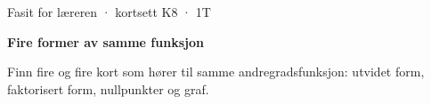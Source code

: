 \documentclass[11pt,a4paper]{article}
\begin{document}
\begin{minipage}[t]{0.8\linewidth}\vspace{0pt}
{\sffamily\small\color{dempet}Fasit for læreren · kortsett K8 · 1T}\par\vspace{0.25em}
{\fontsize{20}{24}\selectfont\bfseries Fire former av samme funksjon}\par\vspace{0.5em}
Finn fire og fire kort som hører til samme andregradsfunksjon: utvidet form, faktorisert form, nullpunkter og graf.\par{}
\end{minipage}\hfill
\begin{minipage}[t]{0.15\linewidth}\vspace{0pt}\raggedleft
{}
\end{minipage}\par\vspace{0.8em}
\end{document}

